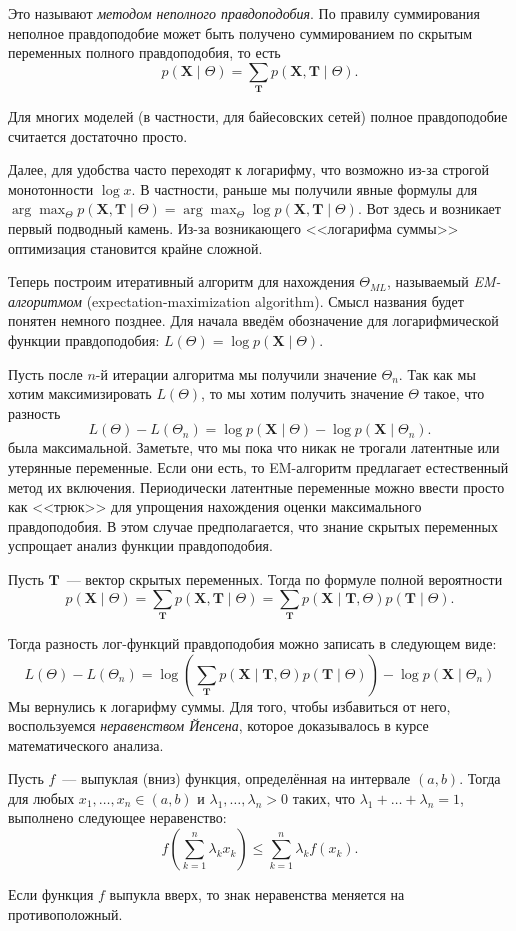 Это называют \emph{методом неполного правдоподобия}. По правилу суммирования 
неполное правдоподобие может быть получено суммированием по скрытым переменных 
полного правдоподобия, то есть
\[
	p(\mathbf{X} \mid \Theta) = \sum_{\mathbf{T}} p(\mathbf{X}, \mathbf{T} \mid 
	\Theta).
\]

Для многих моделей (в частности, для байесовских сетей) полное правдоподобие 
считается достаточно просто.

Далее, для удобства часто переходят к логарифму, что возможно из-за строгой 
монотонности \(\log x\). В частности, раньше мы получили явные формулы для 
\(\arg\max_{\Theta} p(\mathbf{X}, \mathbf{T} \mid \Theta) = \arg\max_{\Theta} 
\log p(\mathbf{X}, \mathbf{T} \mid \Theta)\). Вот здесь и возникает первый 
подводный камень. Из-за возникающего <<логарифма суммы>> оптимизация становится 
крайне сложной. 

Теперь построим итеративный алгоритм для нахождения \(\Theta_{ML}\), называемый 
\emph{EM-алго\-ритмом} (expectation-maximization algorithm). Смысл названия 
будет понятен немного позднее. Для начала введём обозначение для 
логарифмической функции правдоподобия: \(L(\Theta) = \log p(\mathbf{X} \mid 
\Theta)\).

Пусть после \(n\)-й итерации алгоритма мы получили значение \(\Theta_{n}\). Так 
как мы хотим максимизировать \(L(\Theta)\), то мы хотим получить значение 
\(\Theta\) такое, что разность
\[
	L(\Theta) - L(\Theta_{n}) = \log p(\mathbf{X} \mid \Theta) - \log 
	p(\mathbf{X} \mid \Theta_{n}).
\]
была максимальной. Заметьте, что мы пока что никак не трогали латентные или 
утерянные переменные. Если они есть, то EM-алгоритм предлагает естественный 
метод их включения. Периодически латентные переменные можно ввести просто как 
<<трюк>> для упрощения нахождения оценки максимального правдоподобия. В этом 
случае предполагается, что знание скрытых переменных успрощает анализ функции 
правдоподобия. 

Пусть \(\mathbf{T}\)~--- вектор скрытых переменных. Тогда по формуле полной 
вероятности
\[
	p(\mathbf{X} \mid \Theta) = \sum_{\mathbf{T}} p(\mathbf{X}, \mathbf{T} \mid 
	\Theta) = \sum_{\mathbf{T}} p(\mathbf{X} \mid \mathbf{T}, \Theta) 
	p(\mathbf{T} \mid \Theta).
\]

Тогда разность лог-функций правдоподобия можно записать в следующем виде:
\[
	L(\Theta) - L(\Theta_{n}) = \log\left(\sum_{\mathbf{T}} p(\mathbf{X} \mid 
	\mathbf{T}, \Theta) p(\mathbf{T} \mid \Theta)\right) - \log 
	p(\mathbf{X} \mid \Theta_{n})
\]
Мы вернулись к логарифму суммы. Для того, чтобы избавиться от него, 
воспользуемся \emph{неравенством Йенсена}, которое доказывалось в курсе 
математического анализа.
\begin{theorem}
	Пусть \(f\)~--- выпуклая (вниз) функция, определённая на интервале \((a, 
	b)\). Тогда для любых \(x_{1}, \ldots, x_{n} \in (a, b)\) и \(\lambda_{1}, 
	\ldots, \lambda_{n} > 0\) таких, что \(\lambda_{1} + \ldots + \lambda_{n} = 
	1\), выполнено следующее неравенство:
	\[
		f\left(\sum_{k = 1}^{n}\lambda_{k}x_{k}\right) \leq \sum_{k = 
		1}^{n}\lambda_{k}f(x_{k}).
	\]
	
	Если функция \(f\) выпукла вверх, то знак неравенства меняется на 
	противоположный.
\end{theorem}

